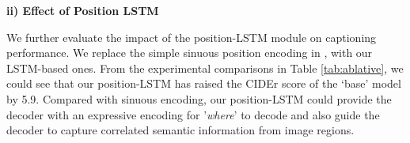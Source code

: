 \documentclass[review]{elsarticle}
\begin{document}
\textbf{ii) Effect of Position LSTM}

We further evaluate the impact of the position-LSTM module on captioning performance. We replace the simple sinuous position encoding in \cite{guo2020normalized}, with our LSTM-based ones. From the experimental comparisons in Table \ref{tab:ablative}, we could see that our position-LSTM has raised the CIDEr score of the `base' model by 5.9. Compared with sinuous encoding, our position-LSTM could provide the decoder with an expressive encoding for '\emph{where}' to decode and also guide the decoder to capture correlated semantic information from image regions.
\begin{table}[tb]
  \large
  \begin{center}
    \caption{Ablation experiment comparisons. The results are reported after cross-entropy loss stage on the dataset ``Karpathy'' test split \cite{karpathy2015deep}.}
    \label{tab:ablative}
  \end{center}
\end{table}
\end{document}

